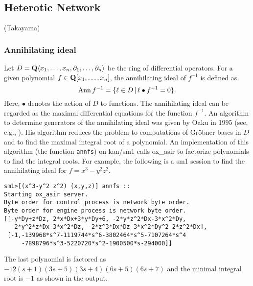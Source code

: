 
\subsection{Heterotic Network}   (Takayama)

\def\pd#1{ \partial_{#1} }
\subsubsection{Annihilating ideal}

Let $D = {\bf Q} \langle x_1, \ldots, x_n , \pd{1}, \ldots, \pd{n} \rangle$
be the ring of differential operators.
For a given polynomial
$ f \in {\bf Q}[x_1, \ldots, x_n] $,
the annihilating ideal of $f^{-1}$ is defined as
$$ {\rm Ann}\, f^{-1} = \{ \ell \in D \,|\,
  \ell \bullet f^{-1} = 0 \}.
$$
Here, $\bullet$ denotes the action of $D$ to functions.
The annihilating ideal can be regarded as the maximal differential
equations for the function $f^{-1}$.
An algorithm to determine generators of the annihilating ideal
was given by Oaku in 1995 (see, e.g., \cite[5.3]{sst-book}).
His algorithm reduces the problem to computations of Gr\"obner bases
in $D$ and to find the maximal integral root of a polynomial.
An implementation of this algorithm (the function {\tt annfs})
on kan/sm1 \cite{kan}
calls ox\_asir to factorize polynomials to find the integral
roots.
For example, the following is a sm1 session to find the annihilating
ideal for $f = x^3 - y^2 z^2$.
\begin{verbatim}
sm1>[(x^3-y^2 z^2) (x,y,z)] annfs ::
Starting ox_asir server.
Byte order for control process is network byte order.
Byte order for engine process is network byte order.
[[-y*Dy+z*Dz, 2*x*Dx+3*y*Dy+6, -2*y*z^2*Dx-3*x^2*Dy, 
  -2*y^2*z*Dx-3*x^2*Dz, -2*z^3*Dx*Dz-3*x^2*Dy^2-2*z^2*Dx], 
 [-1,-139968*s^7-1119744*s^6-3802464*s^5-7107264*s^4
     -7898796*s^3-5220720*s^2-1900500*s-294000]] 
\end{verbatim}
The last polynomial is factored as
$-12(s+1)(3s+5)(3s+4)(6s+5)(6s+7)$
and the minimal integral root is $-1$
as shown in the output.

